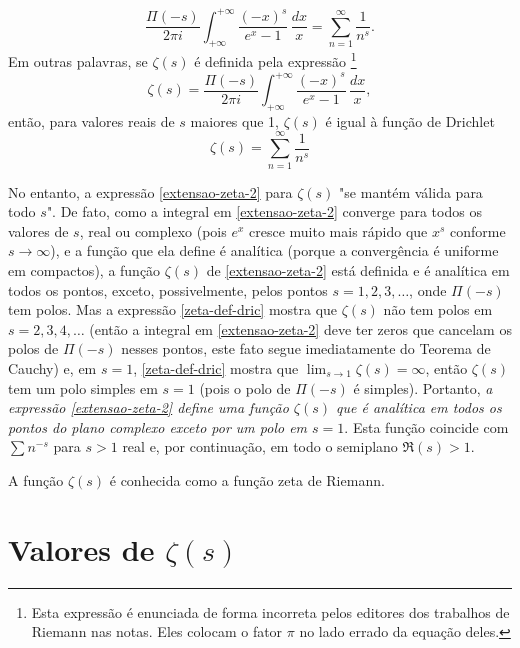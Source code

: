     \begin{equation}
        \label{extensao-zeta-1}
        \frac{\Pi(-s)}{2\pi i} \int_{+\infty}^{+\infty} \frac{(-x)^s}{e^x - 1} \, \frac{dx}{x} = \sum_{n=1}^{\infty}\frac{1}{n^s}.
    \end{equation}
    Em outras palavras, se $\zeta(s)$ é definida pela expressão
    \footnote{
    Esta expressão é enunciada de forma incorreta pelos editores dos trabalhos de Riemann nas notas. Eles colocam o fator $\pi$ no lado errado da equação deles.
    }
    \begin{equation}
        \label{extensao-zeta-2}
        \zeta(s) = \frac{\Pi(-s)}{2\pi i} \int_{+\infty}^{+\infty} \frac{(-x)^s}{e^x - 1} \, \frac{dx}{x},
    \end{equation}
    então, para valores reais de $s$ maiores que 1, $\zeta(s)$ é igual à função de Drichlet
    \begin{equation}
        \label{zeta-def-drich}
        \zeta(s) = \sum_{n=1}^{\infty}\frac{1}{n^s}
    \end{equation}
    
    No entanto, a expressão \eqref{extensao-zeta-2} para $\zeta(s)$ "se mantém válida para todo $s$". De fato, como a integral em \eqref{extensao-zeta-2} converge para todos os valores de $s$, real ou complexo (pois $e^x$ cresce muito mais rápido que $x^s$ conforme $s \to \infty$), e a função que ela define é analítica (porque a convergência é uniforme em compactos), a função $\zeta(s)$ de \eqref{extensao-zeta-2} está definida e é analítica em todos os pontos, exceto, possivelmente, pelos pontos $s = 1, 2, 3, \dots$, onde $\Pi(-s)$ tem polos. Mas a expressão \eqref{zeta-def-dric} mostra que $\zeta(s)$ não tem polos em $s = 2,3,4, \dots$ (então a integral em \eqref{extensao-zeta-2} deve ter zeros que cancelam os polos de $\Pi(-s)$ nesses pontos, este fato segue imediatamente do Teorema de Cauchy) e, em $s = 1$, \eqref{zeta-def-dric} mostra que $\lim_{s \to 1} \zeta(s) = \infty$, então $\zeta(s)$ tem um polo simples em $s=1$ (pois o polo de $\Pi(-s)$ é simples). Portanto, \textit{a expressão \eqref{extensao-zeta-2} define uma função $\zeta(s)$ que é analítica em todos os pontos do plano complexo exceto por um polo em $s = 1$}. Esta função coincide com $\sum n^{-s}$ para $s>1$ real e, por continuação, em todo o semiplano $\Re(s) > 1$.
    
    A função $\zeta(s)$ é conhecida como a função zeta de Riemann.
    
    
    \section{Valores de $\zeta(s)$}
    
